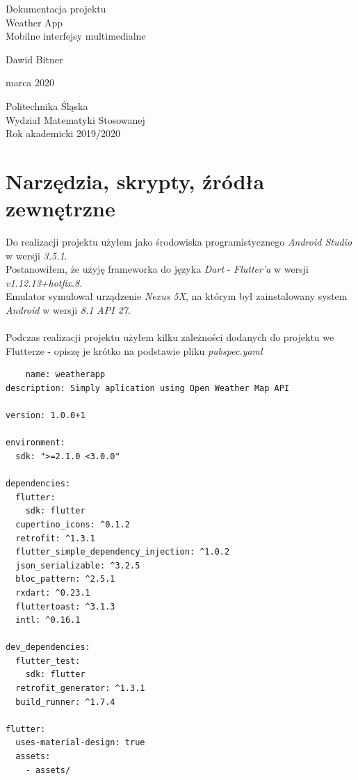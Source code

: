\documentclass[12pt,a4paper]{article}
\begin{document}
    \begin{titlepage}
       \begin{center}
           \vspace*{1cm}
           
           {\fontsize{23}{25}\selectfont Dokumentacja projektu\\Weather App\\Mobilne interfejsy multimedialne}
            \vspace{0.4cm}
            
            {\fontsize{17}{18}\selectfont Dawid Bitner}
           
            {\fontsize{12}{13} marca 2020}
           
            \vfill
            \vspace{0.8cm}
     
            {\fontsize{13}{14}\selectfont Politechnika Śląska\\Wydział Matematyki Stosowanej\\Rok akademicki 2019/2020}
     
       \end{center}
    \end{titlepage}
	\newpage
	\tableofcontents
	\newpage
	\section{Narzędzia, skrypty, źródła zewnętrzne}
	Do realizacji projektu użyłem jako środowiska programistycznego\textit{ Android Studio} w wersji \textit{3.5.1}. \\
    Postanowiłem, że użyję frameworka do języka \textit{Dart} - \textit{Flutter'a} w wersji \textit{v1.12.13+hotfix.8}. \\
	Emulator symulował urządzenie \textit{Nexus 5X}, na którym był zainstalowany system\textit{ Android} w wersji \textit{8.1 API 27}. \\
    \\
    Podczas realizacji projektu użyłem kilku zależności dodanych do projektu we Flutterze - opiszę je krótko na podstawie pliku \textit{pubspec.yaml} \\
    \begin{itemize}
    \begin{verbatim}
    name: weatherapp
description: Simply aplication using Open Weather Map API

version: 1.0.0+1

environment:
  sdk: ">=2.1.0 <3.0.0"

dependencies:
  flutter:
    sdk: flutter
  cupertino_icons: ^0.1.2
  retrofit: ^1.3.1
  flutter_simple_dependency_injection: ^1.0.2
  json_serializable: ^3.2.5
  bloc_pattern: ^2.5.1
  rxdart: ^0.23.1
  fluttertoast: ^3.1.3
  intl: ^0.16.1

dev_dependencies:
  flutter_test:
    sdk: flutter
  retrofit_generator: ^1.3.1
  build_runner: ^1.7.4

flutter:
  uses-material-design: true
  assets:
    - assets/
    
    \end{verbatim}
    \end{itemize}
    
\end{document}
